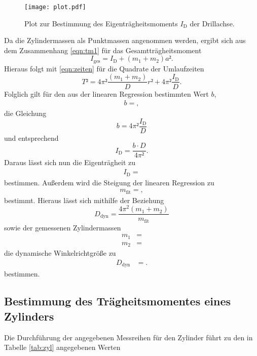 \begin{figure}
  \centering
  \texttt{[image: plot.pdf]}
  \caption{Plot zur Bestimmung des Eigenträgheitsmoments $I_{\text{D}}$ der Drillachse.}
  \label{fig:plot}
\end{figure}

Da die Zylindermassen als Punktmassen angenommen werden, ergibt sich aus dem Zusammenhang \eqref{eqn:tm1} für das Gesamtträgheitsmoment
\begin{equation}
  I_{\text{ges}} = I_{\text{D}} + (m_1+m_2)a².
\end{equation}
Hieraus folgt mit \eqref{eqn:zeiten} für die Quadrate der Umlaufzeiten
\begin{equation}
  T² = 4\pi² \frac{(m_1+m_2)}{D}r² + 4\pi² \frac{I_{\text{D}}}{D}.
\end{equation}
Folglich gilt für den aus der linearen Regression bestimmten Wert $b$,
\begin{align*}
  b = ,
\end{align*}
die Gleichung
\begin{equation}
  b = 4\pi² \frac{I_{\text{D}}}{D}
\end{equation}
und entsprechend
\begin{equation}
  I_{\text{D}} = \frac{b \cdot D}{4\pi²}.
\end{equation}
Daraus lässt sich nun die Eigenträgheit zu
\begin{align*}
  I_{\text{D}} = 
\end{align*}
bestimmen.
Außerdem wird die Steigung der linearen Regression zu
\begin{align*}
  m_{\text{fit}} = ,
\end{align*}
bestimmt.
Hieraus lässt sich mithilfe der Beziehung
\begin{equation}
  D_\text{dyn} = \frac{4 \pi^2 (m_1 + m_2)}{m_\text{fit}}
\end{equation}
sowie der gemessenen Zylindermassen
\begin{align*}
m_1 &= \\
m_2 &= 
\end{align*}
die dynamische Winkelrichtgröße zu
\begin{align*}
  D_\text{dyn}   &=   .
\end{align*}
bestimmen.
\subsection{Bestimmung des Trägheitsmomentes eines Zylinders}
Die Durchführung der angegebenen Messreihen für den Zylinder führt zu den in Tabelle \ref{tab:zyl} angegebenen Werten

